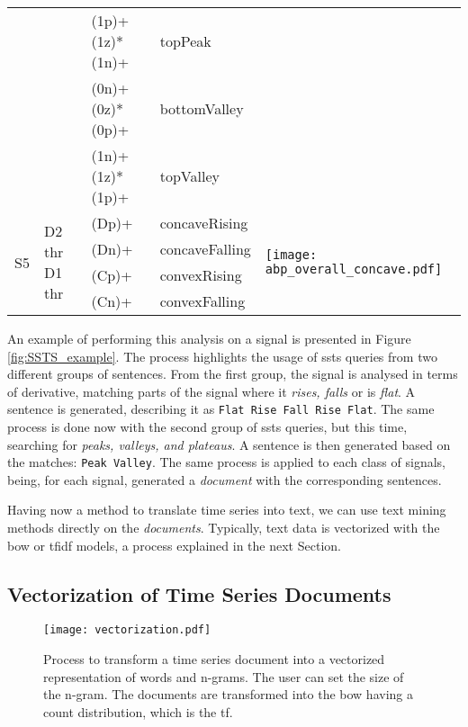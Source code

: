 \begin{table}
\begin{center}
\begin{tabularx}{\linewidth}{ XXXXX }
 & & (1p)+(1z)*(1n)+ & \textcolor{myblue2}{topPeak}\\
 & & (0n)+(0z)*(0p)+ & \textcolor{mypurple}{bottomValley}\\
 & & (1n)+(1z)*(1p)+ & \textcolor{myorange}{topValley}\\
 \hline
\multirow{4}{1em}{S5} & \multirow{4}{6em}{D2 thr D1 thr} & (Dp)+ & \textcolor{mygreen2}{concaveRising} & \multirow{4}{9em}{\texttt{[image: abp\_overall\_concave.pdf]}}\\
& & (Dn)+ & \textcolor{mypurple}{concaveFalling}\\
& & (Cp)+ & \textcolor{myblue2}{convexRising}\\
& &(Cn)+ & \textcolor{myorange}{convexFalling}\\
\bottomrule[1.5pt]
\end{tabularx}
\label{tab:ssts_queries}
\end{center}
\end{table}
 
An example of performing this analysis on a signal is presented in Figure \ref{fig:SSTS_example}. The process highlights the usage of \gls{ssts} queries from two different groups of sentences. From the first group, the signal is analysed in terms of derivative, matching parts of the signal where it \textit{rises, falls} or is \textit{flat}. A sentence is generated, describing it as \texttt{Flat Rise Fall Rise Flat}. The same process is done now with the second group of \gls{ssts} queries, but this time, searching for \textit{peaks, valleys, and plateaus}. A sentence is then generated based on the matches: \texttt{Peak Valley}. The same process is applied to each class of signals, being, for each signal, generated a \textit{document} with the corresponding sentences.

Having now a method to translate time series into text, we can use text mining methods directly on the \textit{documents}. Typically, text data is vectorized with the \gls{bow} or \gls{tfidf} models, a process explained in the next Section.

\subsection{Vectorization of Time Series Documents}

\begin{figure}[!h]
    \centering
    \texttt{[image: vectorization.pdf]}
    \caption{Process to transform a time series document into a vectorized representation of words and n-grams. The user can set the size of the n-gram. The documents are transformed into the \gls{bow} having a count distribution, which is the \gls{tf}.}
    \label{fig:sentence_gen}
\end{figure}

